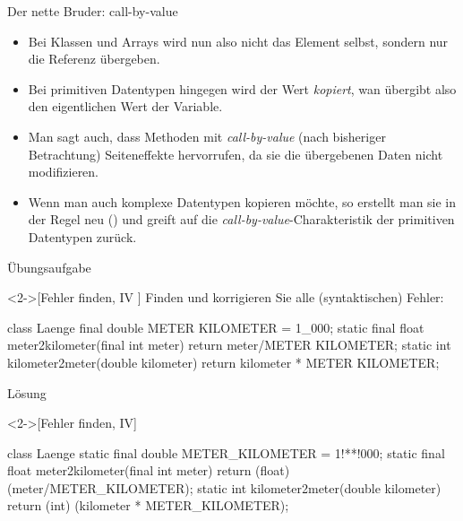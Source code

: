 \begin{frame}{Der nette Bruder: call-by-value}
    \begin{itemize}[<+(1)->]
        \widei
        \item \hypertarget<1>{mrk:call-by-val}{Bei} Klassen und Arrays wird nun also nicht das Element selbst,\pause{} sondern nur die Referenz übergeben.
        \item Bei primitiven Datentypen hingegen wird der Wert \emph{kopiert},\pause{} wan übergibt also den eigentlichen Wert der Variable.
        \item Man sagt auch, dass Methoden mit \emph{call-by-value}  (nach bisheriger Betrachtung) Seiteneffekte hervorrufen,\pause{} da sie die übergebenen Daten nicht modifizieren.
        \item Wenn man auch komplexe Datentypen kopieren möchte,\pause{} so erstellt man sie in der Regel neu () und greift auf die \emph{call-by-value}-Charakteristik der primitiven Datentypen zurück.
    \end{itemize}
\end{frame}

\ifull
\begin{frame}[c,fragile]{Übungsaufgabe}
    \begin{exercise}<2->[Fehler finden, IV ]
        \pause{}Finden und korrigieren Sie alle (syntaktischen) Fehler:\pause{}
        \begin{plainvoid}
class Laenge {
    final double METER KILOMETER = 1_000;
    static final float meter2kilometer(final int meter){
        return meter/METER KILOMETER;
    }
    static int kilometer2meter(double kilometer){
        return kilometer * METER KILOMETER;
    }
}
        \end{plainvoid}
    \end{exercise}
\end{frame}

\begin{frame}[c,fragile]{Lösung}
    \begin{solve}<2->[Fehler finden, IV]
        \pause{}\begin{plainjava}
class Laenge {
    static final double METER_KILOMETER = 1!**!000;
    static final float meter2kilometer(final int meter){
        return (float) (meter/METER_KILOMETER);
    }
    static int kilometer2meter(double kilometer){
        return (int) (kilometer * METER_KILOMETER);
    }
}
        \end{plainjava}
    \end{solve}
\end{frame}


